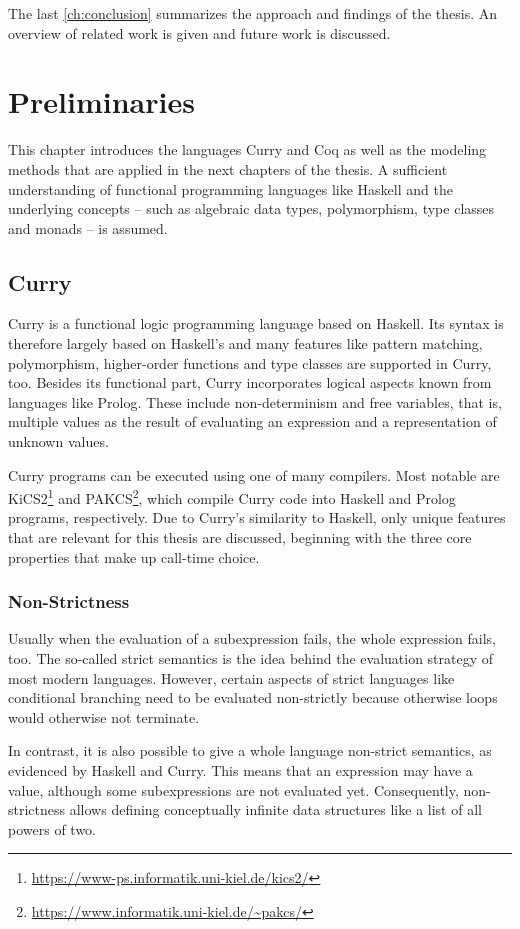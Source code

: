 \documentclass[a4paper, 11pt, fleqn, twoside, abstract=on]{scrreprt}
\begin{document}
The last \autoref{ch:conclusion} summarizes the approach and findings of the thesis.
An overview of related work is given and future work is discussed.

\chapter{Preliminaries}
\label{ch:preliminaries}
This chapter introduces the languages Curry and Coq as well as the modeling methods that are applied in the next chapters of the thesis.
A sufficient understanding of functional programming languages like Haskell and the underlying concepts -- such as algebraic data types, polymorphism, type classes and monads -- is assumed.


\section{Curry}
Curry \citep{hanus2016curry} is a functional logic programming language based on Haskell.
Its syntax is therefore largely based on Haskell's and many features like pattern matching, polymorphism, higher-order functions and type classes are supported in Curry, too.
Besides its functional part, Curry incorporates logical aspects known from languages like Prolog.
These include non-determinism and free variables, that is,  multiple values as the result of evaluating an expression and a representation of unknown values.

Curry programs can be executed using one of many compilers.
Most notable are KiCS2\footnote{\url{https://www-ps.informatik.uni-kiel.de/kics2/}} and PAKCS\footnote{\url{https://www.informatik.uni-kiel.de/~pakcs/}}, which compile Curry code into Haskell and Prolog programs, respectively.
Due to Curry's similarity to Haskell, only unique features that are relevant for this thesis are discussed, beginning with the three core properties that make up call-time choice.

\subsection{Non-Strictness}
Usually when the evaluation of a subexpression fails, the whole expression fails, too.
The so-called strict semantics is the idea behind the evaluation strategy of most modern languages.
However, certain aspects of strict languages like conditional branching need to be evaluated non-strictly because otherwise loops would otherwise not terminate.

In contrast, it is also possible to give a whole language non-strict semantics, as evidenced by Haskell and Curry.
This means that an expression may have a value, although some subexpressions are not evaluated yet.
Consequently, non-strictness allows defining conceptually infinite data structures like a list of all powers of two.
\end{document}
